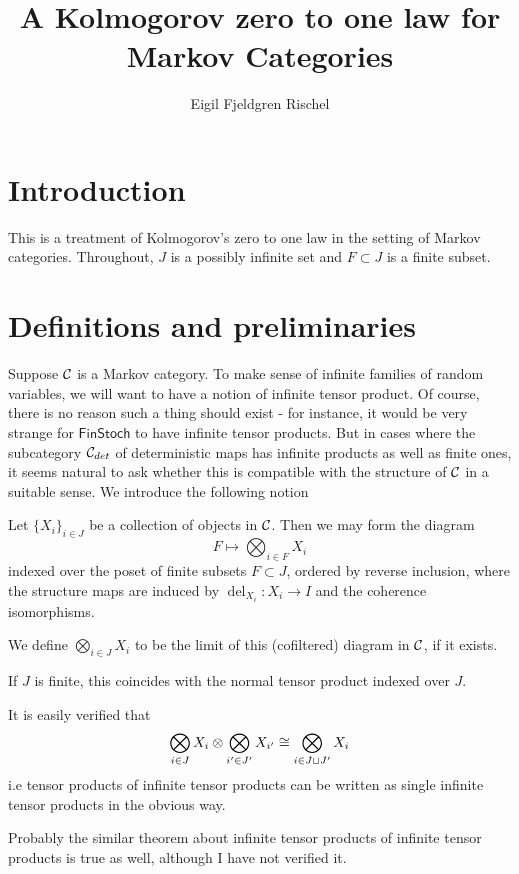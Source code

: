\documentclass{article}
\author{Eigil Fjeldgren Rischel}
\title{A Kolmogorov zero to one law for Markov Categories}
\date{}
\renewcommand{\sf}{\mathsf}
\DeclareMathOperator{\del}{del}
\begin{document}
\maketitle
\section{Introduction}
This is a treatment of Kolmogorov's zero to one law in the setting of Markov categories.
Throughout, $J$ is a possibly infinite set and $F \subset J$ is a finite subset.

\section{Definitions and preliminaries}
Suppose $\mathcal{C}$ is a Markov category.
To make sense of infinite families of random variables,
we will want to have a notion of infinite tensor product.
Of course, there is no reason such a thing should exist - for instance, it would be very strange for $\sf{FinStoch}$ to have infinite tensor products.
But in cases where the subcategory $\mathcal{C}_{det}$ of deterministic maps has infinite products as well as finite ones, it seems natural to ask whether this is compatible with the structure of $\mathcal{C}$ in a suitable sense.
We introduce the following notion
\begin{definition}
    Let $\{X_i\}_{i \in J}$ be a collection of objects in $\mathcal{C}$.
    Then we may form the diagram \[F \mapsto \bigotimes_{i \in F} X_i\]
    indexed over the poset of finite subsets $F \subset J$, ordered by reverse inclusion, where the structure maps are induced by $\del_{X_i}: X_i \to I$ and the coherence isomorphisms.

    We define $\bigotimes_{i \in J}X_i$ to be the limit of this (cofiltered) diagram in $\mathcal{C}$, if it exists.
\end{definition}
\begin{remark}
    If $J$ is finite, this coincides with the normal tensor product indexed over $J$.
\end{remark}
\begin{remark}
    It is easily verified that 
    \[\bigotimes_{i \in J} X_i \otimes \bigotimes_{i' \in J'} X_{i'} \cong \bigotimes_{i \in J \sqcup J'} X_i\]
    i.e tensor products of infinite tensor products can be written as single infinite tensor products in the obvious way.

    Probably the similar theorem about infinite tensor products of infinite tensor products is true as well, although I have not verified it. 
\end{remark}
\end{document}
